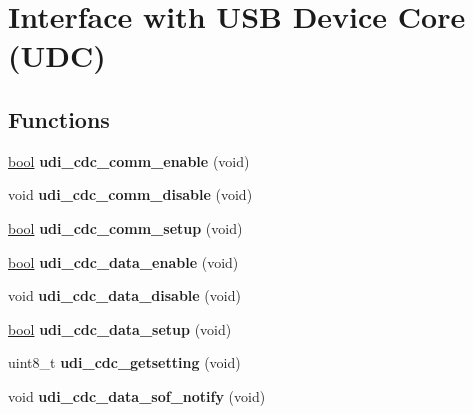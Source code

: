 \hypertarget{group__udi__cdc__group__udc}{\section{Interface with U\-S\-B Device Core (U\-D\-C)}
\label{group__udi__cdc__group__udc}
}
\subsection*{Functions}
\begin{DoxyCompactItemize}
\item 
\hypertarget{group__udi__cdc__group__udc_ga48b8cd17138f1e31d2f705e47bd798fc}{\hyperlink{group__group__xmega__utils_ga97a80ca1602ebf2303258971a2c938e2}{bool} {\bfseries udi\-\_\-cdc\-\_\-comm\-\_\-enable} (void)}\label{group__udi__cdc__group__udc_ga48b8cd17138f1e31d2f705e47bd798fc}

\item 
\hypertarget{group__udi__cdc__group__udc_ga1d9234e7ec38cb7fbc306b1d4624ac7d}{void {\bfseries udi\-\_\-cdc\-\_\-comm\-\_\-disable} (void)}\label{group__udi__cdc__group__udc_ga1d9234e7ec38cb7fbc306b1d4624ac7d}

\item 
\hypertarget{group__udi__cdc__group__udc_ga9f1ce6a914bf00a929285d4b9876ff6c}{\hyperlink{group__group__xmega__utils_ga97a80ca1602ebf2303258971a2c938e2}{bool} {\bfseries udi\-\_\-cdc\-\_\-comm\-\_\-setup} (void)}\label{group__udi__cdc__group__udc_ga9f1ce6a914bf00a929285d4b9876ff6c}

\item 
\hypertarget{group__udi__cdc__group__udc_gacff97f0d95101ef8beebe3a7d5cf1541}{\hyperlink{group__group__xmega__utils_ga97a80ca1602ebf2303258971a2c938e2}{bool} {\bfseries udi\-\_\-cdc\-\_\-data\-\_\-enable} (void)}\label{group__udi__cdc__group__udc_gacff97f0d95101ef8beebe3a7d5cf1541}

\item 
\hypertarget{group__udi__cdc__group__udc_gad6183b6bb4f836b69c2a176b8a1631da}{void {\bfseries udi\-\_\-cdc\-\_\-data\-\_\-disable} (void)}\label{group__udi__cdc__group__udc_gad6183b6bb4f836b69c2a176b8a1631da}

\item 
\hypertarget{group__udi__cdc__group__udc_ga9a66dccf928f55850d243abd1ca51eb3}{\hyperlink{group__group__xmega__utils_ga97a80ca1602ebf2303258971a2c938e2}{bool} {\bfseries udi\-\_\-cdc\-\_\-data\-\_\-setup} (void)}\label{group__udi__cdc__group__udc_ga9a66dccf928f55850d243abd1ca51eb3}

\item 
\hypertarget{group__udi__cdc__group__udc_ga89512d97844e09864336d3df2f73af59}{uint8\-\_\-t {\bfseries udi\-\_\-cdc\-\_\-getsetting} (void)}\label{group__udi__cdc__group__udc_ga89512d97844e09864336d3df2f73af59}

\item 
\hypertarget{group__udi__cdc__group__udc_ga304bed0ef46f8046e41de6e161db0864}{void {\bfseries udi\-\_\-cdc\-\_\-data\-\_\-sof\-\_\-notify} (void)}\label{group__udi__cdc__group__udc_ga304bed0ef46f8046e41de6e161db0864}

\end{DoxyCompactItemize}
